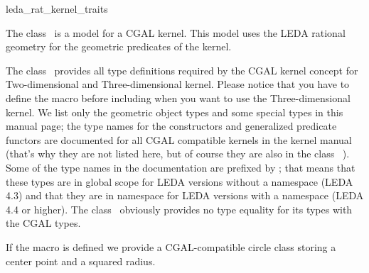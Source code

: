 
\begin{ccRefClass}{leda_rat_kernel_traits}

\ccDefinition


The class \ccRefName\  is a model for a CGAL kernel. This model uses the LEDA rational geometry
for the geometric predicates of the kernel.



\ccHtmlLinksOff


\ccTypes

The class \ccRefName\ provides all type definitions required by the CGAL kernel concept
for Two-dimensional and Three-dimensional kernel. Please notice that
you have to define the macro  before
including  when you want to use the Three-dimensional kernel.
We list only the geometric object types and some special types in this manual page; the type names
for the constructors and generalized predicate functors are documented for all CGAL
compatible kernels in the kernel manual (that's why they are not listed here, but of course
they are also in the class \ccRefName\ ).
Some of the type names in the documentation are prefixed by ;
that means that these types are in global scope for LEDA versions without a namespace
(LEDA 4.3) and that they are in namespace  for LEDA versions with a namespace 
(LEDA 4.4 or higher).
The class \ccRefName\ obviously provides no type equality for its types with the CGAL types.

\ccThreeToTwo
{}

If the macro  is defined we provide a CGAL-compatible circle class
storing a center point and a squared radius.


\end{ccRefClass}
